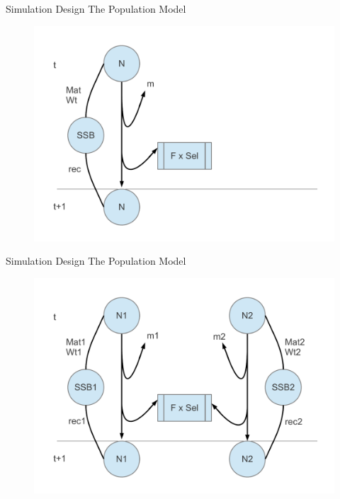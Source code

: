 \documentclass{beamer}
\begin{document}
\begin{withoutheadline}
\begin{frame}{Simulation Design}
  The Population Model
  \begin{figure}
    \centering
    \includegraphics[width=.9\textwidth]{Population-model-half}
  \end{figure}
\end{frame}
\end{withoutheadline}


\begin{withoutheadline}
\begin{frame}{Simulation Design}
  The Population Model
  \begin{figure}
    \centering
    \includegraphics[width=.9\textwidth]{Population-model}
  \end{figure}
\end{frame}
\end{withoutheadline}
\end{document}
